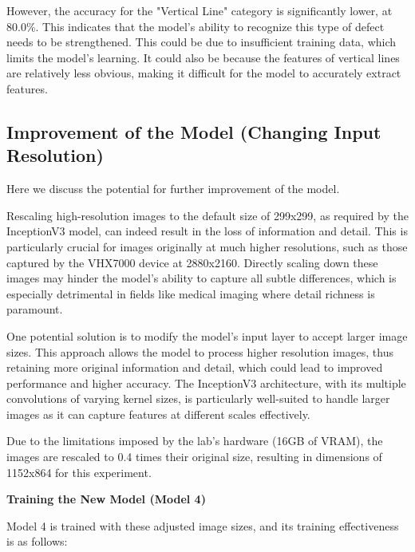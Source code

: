 However, the accuracy for the "Vertical Line" category is significantly lower, at 80.0\%. This indicates that the model's ability to recognize this type of defect needs to be strengthened. This could be due to insufficient training data, which limits the model's learning. It could also be because the features of vertical lines are relatively less obvious, making it difficult for the model to accurately extract features.

\subsection{Improvement of the Model (Changing Input Resolution)}

Here we discuss the potential for further improvement of the model.

Rescaling high-resolution images to the default size of 299x299, as required by the InceptionV3 model, can indeed result in the loss of information and detail. This is particularly crucial for images originally at much higher resolutions, such as those captured by the VHX7000 device at 2880x2160. Directly scaling down these images may hinder the model's ability to capture all subtle differences, which is especially detrimental in fields like medical imaging where detail richness is paramount.

One potential solution is to modify the model's input layer to accept larger image sizes. This approach allows the model to process higher resolution images, thus retaining more original information and detail, which could lead to improved performance and higher accuracy. The InceptionV3 architecture, with its multiple convolutions of varying kernel sizes, is particularly well-suited to handle larger images as it can capture features at different scales effectively.

Due to the limitations imposed by the lab's hardware (16GB of VRAM), the images are rescaled to 0.4 times their original size, resulting in dimensions of 1152x864 for this experiment.

\textbf{Training the New Model (Model 4)}

Model 4 is trained with these adjusted image sizes, and its training effectiveness is as follows:

